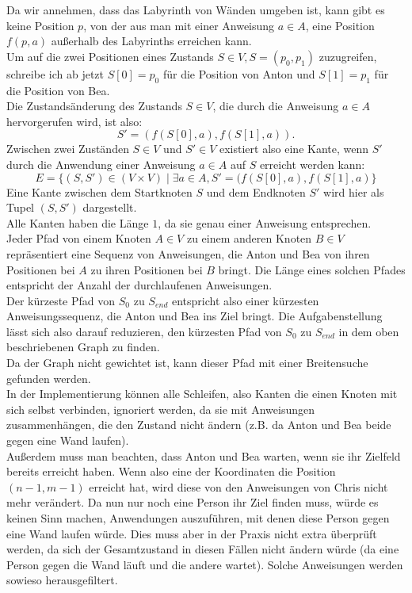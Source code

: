 \documentclass[a4paper,10pt,ngerman]{scrartcl}
\begin{document}
    Da wir annehmen, dass das Labyrinth von Wänden umgeben ist, kann gibt es keine Position $p$, von der aus man mit einer Anweisung $a \in A$, eine Position $f(p,a)$ außerhalb des Labyrinths erreichen kann. \\
    Um auf die zwei Positionen eines Zustands $S \in V, S = (p_0, p_1)$ zuzugreifen, schreibe ich ab jetzt $S[0] = p_0$ für die Position von Anton und $S[1] = p_1$ für die Position von Bea.\\
    Die Zustandsänderung des Zustands $S \in V$, die durch die Anweisung $a \in A$ hervorgerufen wird, ist also: \[S' = (f(S[0], a), f(S[1], a)).\] Zwischen zwei Zuständen $S \in V$ und $S' \in V$ existiert also eine Kante, wenn $S'$ durch die Anwendung einer Anweisung $a \in A$ auf $S$ erreicht werden kann:
    \[E = \{(S, S') \in (V \times V) \mid \exists a \in A, S' = (f(S[0], a), f(S[1], a)\}\]
    Eine Kante zwischen dem Startknoten $S$ und dem Endknoten $S'$ wird hier als Tupel $(S, S')$ dargestellt.\\
    Alle Kanten haben die Länge $1$, da sie genau einer Anweisung entsprechen. \\
    Jeder Pfad von einem Knoten $A \in V$ zu einem anderen Knoten $B \in V$ repräsentiert eine Sequenz von Anweisungen, die Anton und Bea von ihren Positionen bei $A$ zu ihren Positionen bei $B$ bringt.
    Die Länge eines solchen Pfades entspricht der Anzahl der durchlaufenen Anweisungen.\\
    Der kürzeste Pfad von $S_0$ zu $S_{end}$ entspricht also einer kürzesten Anweisungssequenz, die Anton und Bea ins Ziel bringt. Die Aufgabenstellung lässt sich also darauf reduzieren, den kürzesten Pfad von $S_0$ zu $S_{end}$ in dem oben beschriebenen Graph zu finden. \\
    Da der Graph nicht gewichtet ist, kann dieser Pfad mit einer Breitensuche gefunden werden.\\
    In der Implementierung können alle Schleifen, also Kanten die einen Knoten mit sich selbst verbinden, ignoriert werden, da sie mit Anweisungen zusammenhängen, die den Zustand nicht ändern (z.B. da Anton und Bea beide gegen eine Wand laufen). \\
    Außerdem muss man beachten, dass Anton und Bea warten, wenn sie ihr Zielfeld bereits erreicht haben. Wenn also eine der Koordinaten die Position $(n-1,m-1)$ erreicht hat, wird diese von den Anweisungen von Chris nicht mehr verändert. Da nun nur noch eine Person ihr Ziel finden muss, würde es keinen Sinn machen, Anwendungen auszuführen, mit denen diese Person gegen eine Wand laufen würde. Dies muss aber in der Praxis nicht extra überprüft werden, da sich der Gesamtzustand in diesen Fällen nicht ändern würde (da eine Person gegen die Wand läuft und die andere wartet). Solche Anweisungen werden sowieso herausgefiltert.
\end{document}
